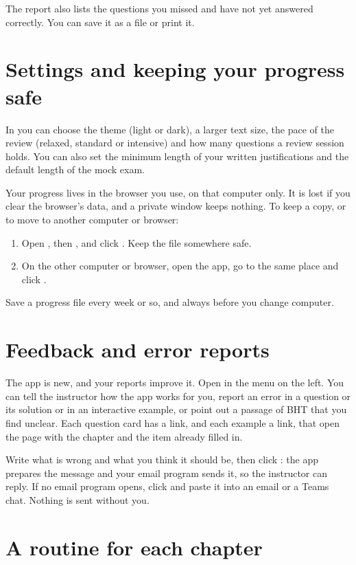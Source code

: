 The report also lists the questions you missed and have not yet answered correctly. You can save it as a file or print it.

\section{Settings and keeping your progress safe}\label{sg:data}

In  you can choose the theme (light or dark), a larger text size, the pace of the review (relaxed, standard or intensive) and how many questions a review session holds. You can also set the minimum length of your written justifications and the default length of the mock exam.

Your progress lives in the browser you use, on that computer only. It is lost if you clear the browser's data, and a private window keeps nothing. To keep a copy, or to move to another computer or browser:
\begin{enumerate}
  \item Open , then , and click . Keep the file somewhere safe.
  \item On the other computer or browser, open the app, go to the same place and click .
\end{enumerate}
Save a progress file every week or so, and always before you change computer.

\section{Feedback and error reports}

The app is new, and your reports improve it. Open  in the menu on the left. You can tell the instructor how the app works for you, report an error in a question or its solution or in an interactive example, or point out a passage of BHT that you find unclear. Each question card has a  link, and each example a  link, that open the page with the chapter and the item already filled in.

Write what is wrong and what you think it should be, then click : the app prepares the message and your email program sends it, so the instructor can reply. If no email program opens, click  and paste it into an email or a Teams chat. Nothing is sent without you.

\section{A routine for each chapter}

